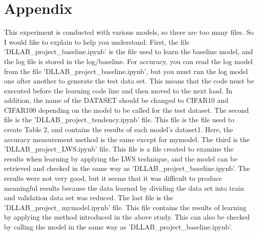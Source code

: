 \documentclass[extendedabs]{bmvc2k}
\begin{document}
\section{Appendix}
  This experiment is conducted with various models, so there are too many files. So I would like to explain to help you understand.
  \newline
  \newline First, the file 'DLLAB\_project\_baseline.ipynb' is the file used to learn the baseline model, and the log file is stored in the log/baseline. 
  For accuracy, you can read the log model from the file 'DLLAB\_project\_baseline.ipynb', but you must run the log model one after another to generate the test data set. 
  This means that the code must be executed before the learning code line and then moved to the next load. 
  In addition, the name of the DATASET should be changed to CIFAR10 and CIFAR100 depending on the model to be called for the test dataset.
  \newline
  \newline The second file is the 'DLLAB\_project\_tendency.ipynb' file. This file is the file used to create Table 2, and contains the results of each model's dataset1. 
  Here, the accuracy measurement method is the same except for mymodel.
  \newline
  \newline The third is the 'DLLAB\_project\_LWS.ipynb' file. This file is a file created to examine the results when learning by applying the LWS technique, 
  and the model can be retrieved and checked in the same way as 'DLLAB\_project\_baseline.ipynb'. 
  The results were not very good, but it seems that it was difficult to produce meaningful results 
  because the data learned by dividing the data set into train and validation data set was reduced.
  \newline
  \newline The last file is the 'DLLAB\_project\_mymodel.ipynb' file. This file contains the results of learning by applying the method introduced in the above study. 
  This can also be checked by calling the model in the same way as 'DLLAB\_project\_baseline.ipynb'.






\newpage

\end{document}
